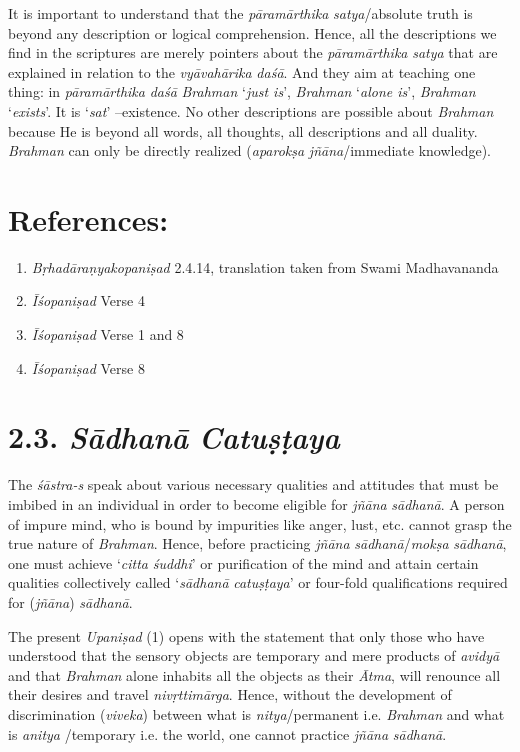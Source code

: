 It is important to understand that the \emph{pāramārthika} \emph{satya}/absolute truth is beyond any description or logical comprehension. Hence, all the descriptions we find in the scriptures are merely pointers about the \emph{pāramārthika} \emph{satya} that are explained in relation to the \emph{vyāvahārika} \emph{daśā}. And they aim at teaching one thing: in \emph{pāramārthika} \emph{daśā} \emph{Brahman} `\emph{just is}', \emph{Brahman} `\emph{alone is}', \emph{Brahman} `\emph{exists}'. It is `\emph{sat}' --existence. No other descriptions are possible about \emph{Brahman} because He is beyond all words, all thoughts, all descriptions and all duality. \emph{Brahman} can only be directly realized (\emph{aparokṣa} \emph{jñāna}/immediate knowledge).

\section*{References:}

\begin{enumerate}
\item
  \emph{Bṛhadāraṇyakopaniṣad} 2.4.14, translation taken from Swami Madhavananda
\item
  \emph{Īśopaniṣad} Verse 4
\item
  \emph{Īśopaniṣad} Verse 1 and 8
\item
  \emph{Īśopaniṣad} Verse 8
\end{enumerate}

\section{2.3. \emph{Sādhanā} \emph{Catuṣṭaya}}

The \emph{śāstra-s} speak about various necessary qualities and attitudes that must be imbibed in an individual in order to become eligible for \emph{jñāna} \emph{sādhanā}. A person of impure mind, who is bound by impurities like anger, lust, etc. cannot grasp the true nature of \emph{Brahman}. Hence, before practicing \emph{jñāna} \emph{sādhanā}/\emph{mokṣa} \emph{sādhanā}, one must achieve `\emph{citta} \emph{śuddhi}' or purification of the mind and attain certain qualities collectively called `\emph{sādhanā} \emph{catuṣṭaya}' or four-fold qualifications required for (\emph{jñāna}) \emph{sādhanā}.

The present \emph{Upaniṣad} (1) opens with the statement that only those who have understood that the sensory objects are temporary and mere products of \emph{avidyā} and that \emph{Brahman} alone inhabits all the objects as their \emph{Ātma}, will renounce all their desires and travel \emph{nivṛttimārga}. Hence, without the development of discrimination (\emph{viveka}) between what is \emph{nitya}/permanent i.e. \emph{Brahman} and what is \emph{anitya} /temporary i.e. the world, one cannot practice \emph{jñāna} \emph{sādhanā}.

